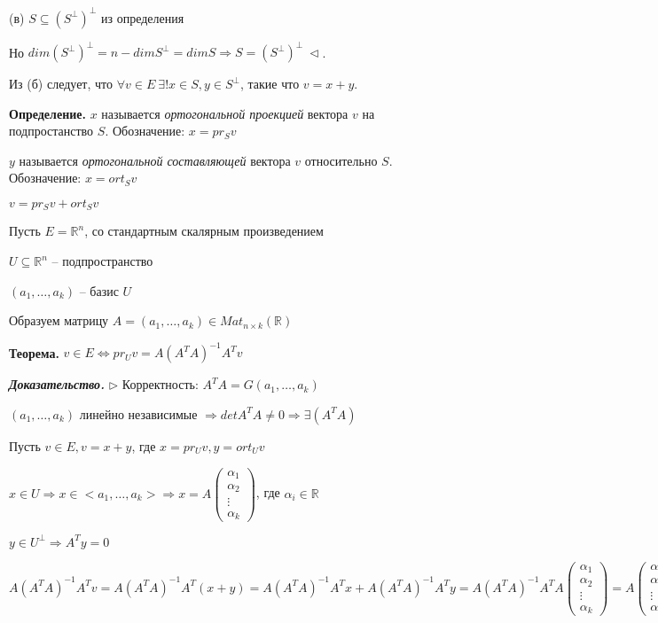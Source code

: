 (в) $S \subseteq (S^{\bot})^{\bot}$ из определения

Но $dim(S^{\bot})^{\bot} = n - dim S^{\bot} = dim S \Rightarrow S = (S^{\bot})^{\bot} \ \lhd$.

\vspace{\baselineskip}
Из (б) следует, что $\forall v \in E \ \exists! x \in S, y \in S^{\bot}$, такие что $v = x + y$.

\vspace{\baselineskip}
\textbf{Определение.} $x$ называется \textit{ортогональной проекцией} вектора $v$ на подпростанство $S$. Обозначение: $x = pr_S v$

$y$ называется \textit{ортогональной составляющей} вектора $v$ относительно $S$. Обозначение: $x = ort_S v$

$v = pr_S v + ort_S v$

\vspace{\baselineskip}
Пусть $E = \mathbb{R}^n$, со стандартным скалярным произведением

$U \subseteq \mathbb{R}^n$ -- подпространство

$(a_1, \dots, a_k)$ -- базис $U$

Образуем матрицу $A = (a_1, \dots, a_k) \in Mat_{n \times k} (\mathbb{R})$

\vspace{\baselineskip}
\textbf{Теорема.} $v \in E \Leftrightarrow pr_U v = A (A^T A)^{-1} A^T v$

\vspace{\baselineskip}
\textbf{\textit{Доказательство.}} $\rhd$ Корректность: $A^T A = G(a_1, \dots, a_k)$

$(a_1, \dots, a_k)$ линейно независимые $\Rightarrow det A^T A \neq 0 \Rightarrow \exists (A^T A)$

Пусть $v \in E, v = x + y$, где $x = pr_U v, y = ort_U v$

$x \in U \Rightarrow x \in <a_1, \dots, a_k> \Rightarrow x  = A \begin{pmatrix} \alpha_1 \\ \alpha_2 \\ \vdots \\ \alpha_k \end{pmatrix}$, где $\alpha_i \in \mathbb{R}$

$y \in U^{\bot} \Rightarrow A^T y = 0$

$A (A^T A)^{-1} A^T v = A (A^T A)^{-1} A^T (x + y) = A (A^T A)^{-1} A^T x + A (A^T A)^{-1} A^T y = A (A^T A)^{-1} A^T A \begin{pmatrix} \alpha_1 \\ \alpha_2 \\ \vdots \\ \alpha_k \end{pmatrix} = A \begin{pmatrix} \alpha_1 \\ \alpha_2 \\ \vdots \\ \alpha_k \end{pmatrix} = pr_U v \ \lhd$


